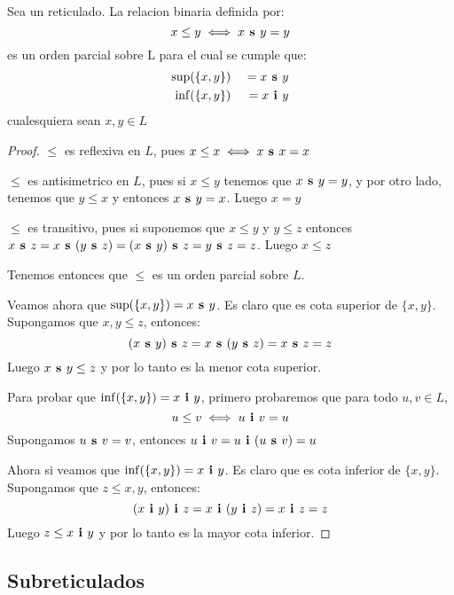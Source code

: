 \begin{theorem}
  Sea \reticulAlg un reticulado. La relacion binaria definida por:
  $$
  x \leq y \iff x\textbf{ s }y = y
  $$
  es un orden parcial sobre L para el cual se cumple que:
  \begin{alignat*}{2}
    \sup&(\{x, y\}) &\ = x\textbf{ s }y\\
    \inf&(\{x, y\}) &\ = x\textbf{ i }y
  \end{alignat*}
  cualesquiera sean $x, y \in L$
\end{theorem}
\begin{proof}
  $\leq$ es reflexiva en $L$, pues $x \leq x \iff x\textbf{ s }x = x$

  $\leq$ es antisimetrico en $L$, pues si $x \leq y$ tenemos que $x\textbf{ s }y = y$, y por otro lado,
  tenemos que $y \leq x$ y entonces $x\textbf{ s }y = x$. Luego $x = y$

  $\leq$ es transitivo, pues si suponemos que $x \leq y$ y $y \leq z$ entonces \\
  $x\textbf{ s }z = x\textbf{ s }(y\textbf{ s }z) = (x\textbf{ s }y)\textbf{ s }z = y\textbf{ s }z = z$. Luego $x \leq z$

  Tenemos entonces que $\leq$ es un orden parcial sobre $L$.
  
  Veamos ahora que $\sup(\{x, y\}) = x\textbf{ s }y$. Es claro que  es cota superior de $\{x, y\}$.
  Supongamos que $x, y \leq z$, entonces:
  $$
  (x\textbf{ s }y)\textbf{ s }z = x\textbf{ s }(y\textbf{ s }z) = x\textbf{ s }z = z
  $$
  Luego $x\textbf{ s }y \leq z$ y por lo tanto  es la menor cota superior.

  Para probar que $\inf(\{x, y\}) = x\textbf{ i }y$, primero probaremos que para todo $u, v \in L$,
  $$
  u \leq v \iff u\textbf{ i }v = u
  $$
  Supongamos $u\textbf{ s }v = v$, entonces $u\textbf{ i }v = u\textbf{ i }(u\textbf{ s }v) = u$

  Ahora si veamos que $\inf(\{x, y\}) = x\textbf{ i }y$. Es claro que  es cota inferior de $\{x, y\}$.
  Supongamos que $z \leq x, y$, entonces:
  $$
  (x\textbf{ i }y)\textbf{ i }z = x\textbf{ i }(y\textbf{ i }z) = x\textbf{ i }z = z
  $$
  Luego $z \leq x\textbf{ i }y$ y por lo tanto  es la mayor cota inferior. 
\end{proof}

\subsection{Subreticulados}

